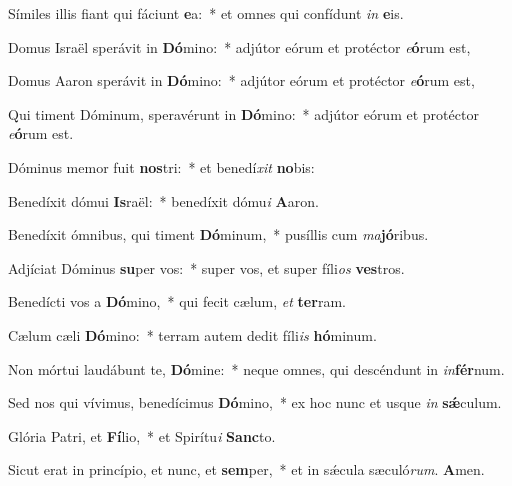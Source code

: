 \item Símiles illis fiant qui fáciunt \textbf{e}a:~* et omnes qui confídunt \textit{in} \textbf{e}is.

\item Domus Israël sperávit in \textbf{Dó}mino:~* adjútor eórum et protéctor \textit{e}\textbf{ó}rum est,

\item Domus Aaron sperávit in \textbf{Dó}mino:~* adjútor eórum et protéctor \textit{e}\textbf{ó}rum est,

\item Qui timent Dóminum, speravérunt in \textbf{Dó}mino:~* adjútor eórum et protéctor \textit{e}\textbf{ó}rum est.

\item Dóminus memor fuit \textbf{nos}tri:~* et benedí\textit{xit} \textbf{no}bis:

\item Benedíxit dómui \textbf{Is}raël:~* benedíxit dómu\textit{i} \textbf{A}aron.

\item Benedíxit ómnibus, qui timent \textbf{Dó}minum,~* pusíllis cum \textit{ma}\textbf{jó}ribus.

\item Adjíciat Dóminus \textbf{su}per vos:~* super vos, et super fíli\textit{os} \textbf{ves}tros.

\item Benedícti vos a \textbf{Dó}mino,~* qui fecit cælum, \textit{et} \textbf{ter}ram.

\item Cælum cæli \textbf{Dó}mino:~* terram autem dedit fíli\textit{is} \textbf{hó}minum.

\item Non mórtui laudábunt te, \textbf{Dó}mine:~* neque omnes, qui descéndunt in \textit{in}\textbf{fér}num.

\item Sed nos qui vívimus, benedícimus \textbf{Dó}mino,~* ex hoc nunc et usque \textit{in} \textbf{sǽ}culum.

\item Glória Patri, et \textbf{Fí}lio,~* et Spirítu\textit{i} \textbf{Sanc}to.

\item Sicut erat in princípio, et nunc, et \textbf{sem}per,~* et in sǽcula sæculó\textit{rum}. \textbf{A}men.
